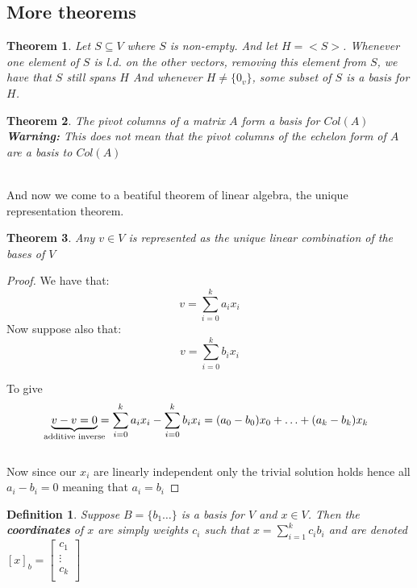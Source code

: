 \documentclass[titlepage]{article}
\newtheorem{thm}{Theorem}[subsection]
\newtheorem{definition}{Definition}[subsection]
\numberwithin{equation}{subsection}
\begin{document}
\subsection{More theorems}

\begin{thm}
Let $S\subseteq V$ where $S$ is non-empty. And let $H = <S>$. Whenever one element of $S$ is l.d. on the other vectors, removing this element from $S$, we have that $S$ still spans $H$ And whenever $H \not = \{0_{v}\}$, some subset of $S$ is a basis for $H$. 
\end{thm}

\begin{thm}
The pivot columns of a matrix $A$ form a basis for $Col(A)$
\\
\textbf{Warning:} This does not mean that the pivot columns of the echelon form of $A$ are a basis to $Col(A)$ 
\end{thm}
\\

And now we come to a beatiful theorem of linear algebra, the unique representation theorem.

\begin{thm}
Any $v\in V$ is represented as the unique linear combination of the bases of $V$
\end{thm}

\begin{proof}
We have that:
$$ v = \sum_{i=0}^{k} a_{i}x_{i}$$
Now suppose also that:
$$ v = \sum_{i=0}^{k} b_{i}x_{i}$$

To give $$ \underbrace{v - v = 0}_{\text{\makebox[0pt]{additive inverse}}} = \sum_{i=0}^{k} a_{i}x_{i} - \sum_{i=0}^{k} b_{i}x_{i} = (a_{0} - b_{0})x_{0} + \ldots + (a_{k} - b_{k})x_{k}  $$
\\

Now since our $x_{i}$ are linearly independent only the trivial solution holds hence all $a_{i} - b_{i} = 0$ meaning that $a_{i} = b_{i}$
\end{proof}

\begin{definition}
Suppose $B = \{b_{1} \ldots\}$ is a basis for $V$ and $x \in V$. Then the \textbf{coordinates} of $x$ are simply weights $c_{i}$ such that $x =  \sum_{i=1}^{k} c_{i}b_{i}$ and are denoted $[x]_{b} = \begin{bmatrix}
    c_{1}\\
    \vdots \\
    c_{k}\\
\end{bmatrix}$
\end{definition}
\end{document}
